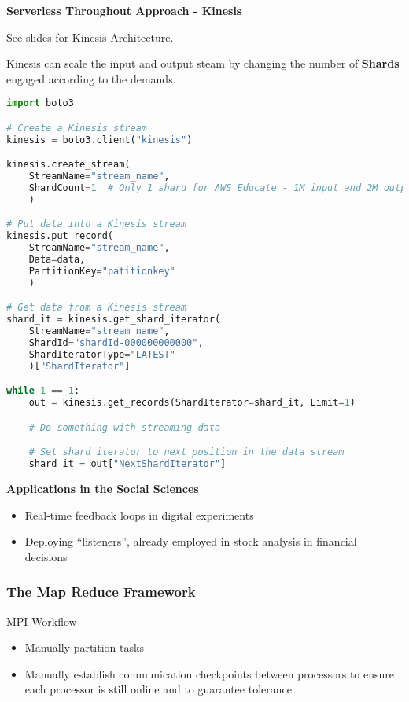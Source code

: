 \documentclass{article}
\begin{document}
\textbf{Serverless Throughout Approach - Kinesis}

See slides for Kinesis Architecture.

Kinesis can scale the input and output steam by changing the number of \textbf{Shards} engaged according to the demands.

\begin{lstlisting}[language=Python]
import boto3

# Create a Kinesis stream
kinesis = boto3.client("kinesis")

kinesis.create_stream(
    StreamName="stream_name",
    ShardCount=1  # Only 1 shard for AWS Educate - 1M input and 2M output
    )

# Put data into a Kinesis stream
kinesis.put_record(
    StreamName="stream_name",
    Data=data,
    PartitionKey="patitionkey"
    )

# Get data from a Kinesis stream
shard_it = kinesis.get_shard_iterator(
    StreamName="stream_name",
    ShardId="shardId-000000000000",
    ShardIteratorType="LATEST"
    )["ShardIterator"]

while 1 == 1:
    out = kinesis.get_records(ShardIterator=shard_it, Limit=1)

    # Do something with streaming data

    # Set shard iterator to next position in the data stream
    shard_it = out["NextShardIterator"]
\end{lstlisting}

\textbf{Applications in the Social Sciences}

\begin{itemize}
    \item Real-time feedback loops in digital experiments
    \item Deploying ``listeners'', already employed in stock analysis in financial decisions
\end{itemize}

\subsubsection{The Map Reduce Framework}

MPI Workflow

\begin{itemize}
    \item Manually partition tasks
    \item Manually establish communication checkpoints between processors to ensure each processor is still online and to guarantee tolerance
\end{itemize}
\end{document}
